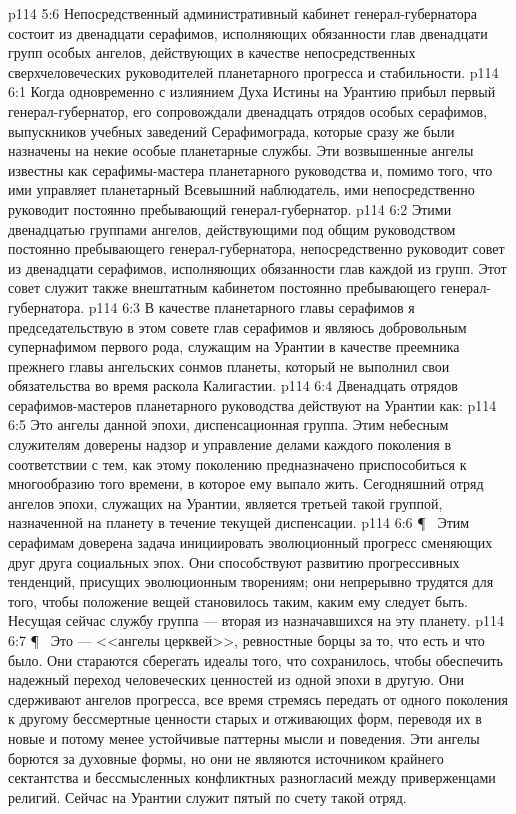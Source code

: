 \vs p114 5:6 Непосредственный административный кабинет генерал\hyp{}губернатора состоит из двенадцати серафимов, исполняющих обязанности глав двенадцати групп особых ангелов, действующих в качестве непосредственных сверхчеловеческих руководителей планетарного прогресса и стабильности.
\vs p114 6:1 Когда одновременно с излиянием Духа Истины на Урантию прибыл первый генерал\hyp{}губернатор, его сопровождали двенадцать отрядов особых серафимов, выпускников учебных заведений Серафимограда, которые сразу же были назначены на некие особые планетарные службы. Эти возвышенные ангелы известны как серафимы\hyp{}мастера планетарного руководства и, помимо того, что ими управляет планетарный Всевышний наблюдатель, ими непосредственно руководит постоянно пребывающий генерал\hyp{}губернатор.
\vs p114 6:2 Этими двенадцатью группами ангелов, действующими под общим руководством постоянно пребывающего генерал\hyp{}губернатора, непосредственно руководит совет из двенадцати серафимов, исполняющих обязанности глав каждой из групп. Этот совет служит также внештатным кабинетом постоянно пребывающего генерал\hyp{}губернатора.
\vs p114 6:3 В качестве планетарного главы серафимов я председательствую в этом совете глав серафимов и являюсь добровольным супернафимом первого рода, служащим на Урантии в качестве преемника прежнего главы ангельских сонмов планеты, который не выполнил свои обязательства во время раскола Калигастии.
\vs p114 6:4 Двенадцать отрядов серафимов\hyp{}мастеров планетарного руководства действуют на Урантии как:
\vs p114 6:5 \bibnobreakspace {} Это ангелы данной эпохи, диспенсационная группа. Этим небесным служителям доверены надзор и управление делами каждого поколения в соответствии с тем, как этому поколению предназначено приспособиться к многообразию того времени, в которое ему выпало жить. Сегодняшний отряд ангелов эпохи, служащих на Урантии, является третьей такой группой, назначенной на планету в течение текущей диспенсации.
\vs p114 6:6 \P\ \bibnobreakspace {} Этим серафимам доверена задача инициировать эволюционный прогресс сменяющих друг друга социальных эпох. Они способствуют развитию прогрессивных тенденций, присущих эволюционным творениям; они непрерывно трудятся для того, чтобы положение вещей становилось таким, каким ему следует быть. Несущая сейчас службу группа --- вторая из назначавшихся на эту планету.
\vs p114 6:7 \P\ \bibnobreakspace {} Это --- <<ангелы церквей>>, ревностные борцы за то, что есть и что было. Они стараются сберегать идеалы того, что сохранилось, чтобы обеспечить надежный переход человеческих ценностей из одной эпохи в другую. Они сдерживают ангелов прогресса, все время стремясь передать от одного поколения к другому бессмертные ценности старых и отживающих форм, переводя их в новые и потому менее устойчивые паттерны мысли и поведения. Эти ангелы борются за духовные формы, но они не являются источником крайнего сектантства и бессмысленных конфликтных разногласий между приверженцами религий. Сейчас на Урантии служит пятый по счету такой отряд.
